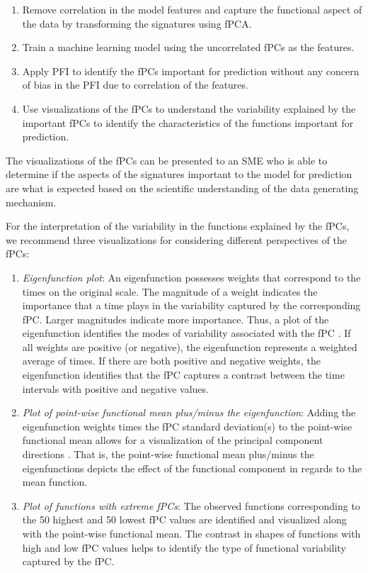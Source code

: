 \documentclass[letterpaper]{article}
\begin{document}
\begin{enumerate}
\item Remove correlation in the model features and capture the functional aspect of the data by transforming the signatures using fPCA.
\item Train a machine learning model using the uncorrelated fPCs as the features.
\item Apply PFI to identify the fPCs important for prediction without any concern of bias in the PFI due to correlation of the features.
\item Use visualizations of the fPCs to understand the variability explained by the important fPCs to identify the characteristics of the functions important for prediction.
\end{enumerate}

The visualizations of the fPCs can be presented to an SME who is able to determine if the aspects of the signatures important to the model for prediction are what is expected based on the scientific understanding of the data generating mechanism.

For the interpretation of the variability in the functions explained by the fPCs, we recommend three visualizations for considering different perspectives of the fPCs:

\begin{enumerate}
\item \textit{Eigenfunction plot}: An eigenfunction possesses weights that correspond to the times on the original scale. The magnitude of a weight indicates the importance that a time plays in the variability captured by the corresponding fPC. Larger magnitudes indicate more importance. Thus, a plot of the eigenfunction identifies the modes of variability associated with the fPC \cite{ramsay:2005}. If all weights are positive (or negative), the eigenfunction represents a weighted average of times. If there are both positive and negative weights, the eigenfunction identifies that the fPC captures a contrast between the time intervals with positive and negative values.
\item \textit{Plot of point-wise functional mean plus/minus the eigenfunction}: Adding the eigenfunction weights times the fPC standard deviation(s) to the point-wise functional mean allows for a visualization of the principal component directions \cite{ramsay:2005}. That is, the point-wise functional mean plus/minus the eigenfunctions depicts the effect of the functional component in regards to the mean function.
\item \textit{Plot of functions with extreme fPCs}: The observed functions corresponding to the 50 highest and 50 lowest fPC values are identified and visualized along with the point-wise functional mean. The contrast in shapes of functions with high and low fPC values helps to identify the type of functional variability captured by the fPC.
\end{enumerate}
\end{document}
